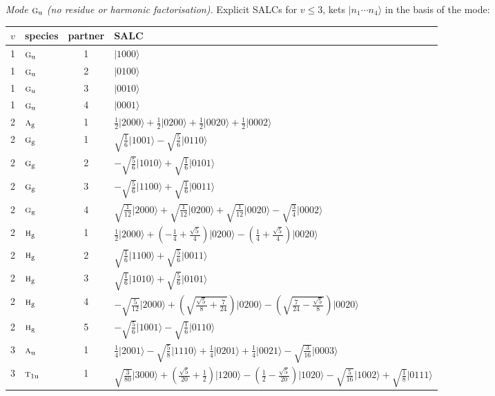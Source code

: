 \documentclass[11pt]{article}
\newcommand{\irr}[1]{\text{\normalfont\scshape #1}}
\newcommand{\ptag}[1]{\mathrm{#1}}
\newcommand{\occ}[1]{\lvert #1\rangle}
\begin{document}
\emph{Mode $\irr{g}_{\ptag{u}}$ (no residue or harmonic factorisation).} Explicit SALCs for $v\le3$, kets $\occ{n_1\cdots n_{4}}$ in the basis of the mode:
\begin{longtable}{c l c p{}}\hline $v$ & species & partner & SALC\\ \hline\endhead
1 & $\irr{g}_{\ptag{u}}$ & 1 & $\occ{1000}$\\
1 & $\irr{g}_{\ptag{u}}$ & 2 & $\occ{0100}$\\
1 & $\irr{g}_{\ptag{u}}$ & 3 & $\occ{0010}$\\
1 & $\irr{g}_{\ptag{u}}$ & 4 & $\occ{0001}$\\
\hline
2 & $\irr{a}_{\ptag{g}}$ & 1 & $\tfrac{1}{2}\occ{2000}+\tfrac{1}{2}\occ{0200}+\tfrac{1}{2}\occ{0020}+\tfrac{1}{2}\occ{0002}$\\
2 & $\irr{g}_{\ptag{g}}$ & 1 & $\sqrt{\tfrac{1}{6}}\occ{1001}-\sqrt{\tfrac{5}{6}}\occ{0110}$\\
2 & $\irr{g}_{\ptag{g}}$ & 2 & $-\sqrt{\tfrac{5}{6}}\occ{1010}+\sqrt{\tfrac{1}{6}}\occ{0101}$\\
2 & $\irr{g}_{\ptag{g}}$ & 3 & $-\sqrt{\tfrac{5}{6}}\occ{1100}+\sqrt{\tfrac{1}{6}}\occ{0011}$\\
2 & $\irr{g}_{\ptag{g}}$ & 4 & $\sqrt{\tfrac{1}{12}}\occ{2000}+\sqrt{\tfrac{1}{12}}\occ{0200}+\sqrt{\tfrac{1}{12}}\occ{0020}-\sqrt{\tfrac{3}{4}}\occ{0002}$\\
2 & $\irr{h}_{\ptag{g}}$ & 1 & $\tfrac{1}{2}\occ{2000}+(- \frac{1}{4} + \frac{\sqrt{5}}{4})\occ{0200}-(\frac{1}{4} + \frac{\sqrt{5}}{4})\occ{0020}$\\
2 & $\irr{h}_{\ptag{g}}$ & 2 & $\sqrt{\tfrac{1}{6}}\occ{1100}+\sqrt{\tfrac{5}{6}}\occ{0011}$\\
2 & $\irr{h}_{\ptag{g}}$ & 3 & $\sqrt{\tfrac{1}{6}}\occ{1010}+\sqrt{\tfrac{5}{6}}\occ{0101}$\\
2 & $\irr{h}_{\ptag{g}}$ & 4 & $-\sqrt{\tfrac{5}{12}}\occ{2000}+(\sqrt{\frac{\sqrt{5}}{8} + \frac{7}{24}})\occ{0200}-(\sqrt{\frac{7}{24} - \frac{\sqrt{5}}{8}})\occ{0020}$\\
2 & $\irr{h}_{\ptag{g}}$ & 5 & $-\sqrt{\tfrac{5}{6}}\occ{1001}-\sqrt{\tfrac{1}{6}}\occ{0110}$\\
\hline
3 & $\irr{a}_{\ptag{u}}$ & 1 & $\tfrac{1}{4}\occ{2001}-\sqrt{\tfrac{5}{8}}\occ{1110}+\tfrac{1}{4}\occ{0201}+\tfrac{1}{4}\occ{0021}-\sqrt{\tfrac{3}{16}}\occ{0003}$\\
3 & $\irr{t}_{1\ptag{u}}$ & 1 & $\sqrt{\tfrac{3}{80}}\occ{3000}+(\frac{\sqrt{5}}{20} + \frac{1}{2})\occ{1200}-(\frac{1}{2} - \frac{\sqrt{5}}{20})\occ{1020}-\sqrt{\tfrac{5}{16}}\occ{1002}+\sqrt{\tfrac{1}{8}}\occ{0111}$\\

\end{longtable}
\end{document}
